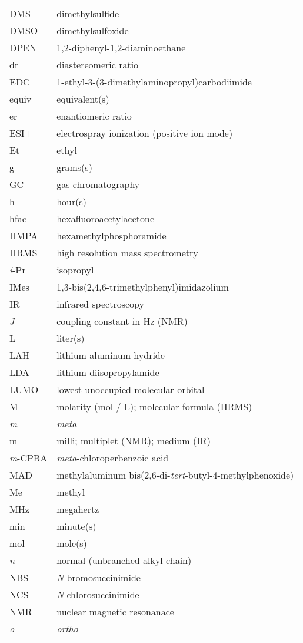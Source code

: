 {\begin{supertabular}{p{1.5in}l}
DMS&dimethylsulfide\\
DMSO&dimethylsulfoxide\\
DPEN&1,2-diphenyl-1,2-diaminoethane\\
dr&diastereomeric ratio\\
EDC&1-ethyl-3-(3-dimethylaminopropyl)carbodiimide\\
equiv&equivalent(s)\\
er&enantiomeric ratio\\
ESI$+$&electrospray ionization (positive ion mode) \\
Et&ethyl\\
g&grams(s)\\
GC&gas chromatography\\
h&hour(s)\\
hfac&hexafluoroacetylacetone \\
HMPA&hexamethylphosphoramide\\
HRMS&high resolution mass spectrometry\\
\textit{i}-Pr&isopropyl\\
IMes&1,3-bis(2,4,6-trimethylphenyl)imidazolium\\
IR&infrared spectroscopy\\
\textit{J}&coupling constant in Hz (NMR)\\
L & liter(s) \\
LAH&lithium aluminum hydride\\
LDA&lithium diisopropylamide\\
LUMO&lowest unoccupied molecular orbital\\
M & molarity (mol / L); molecular formula (HRMS) \\ 
\textit{m}&\textit{meta}\\
m&milli; multiplet (NMR); medium (IR)\\
\textit{m}-CPBA&\textit{meta}-chloroperbenzoic acid\\
MAD&methylaluminum bis(2,6-di-\textit{tert}-butyl-4-methylphenoxide)\\
Me&methyl\\
MHz & megahertz \\
min&minute(s)\\
mol&mole(s)\\
\textit{n}&normal (unbranched alkyl chain)\\
NBS&\textit{N}-bromosuccinimide\\
NCS&\textit{N}-chlorosuccinimide\\
NMR&nuclear magnetic resonanace\\
\textit{o}&\textit{ortho} \\

\end{supertabular}}
